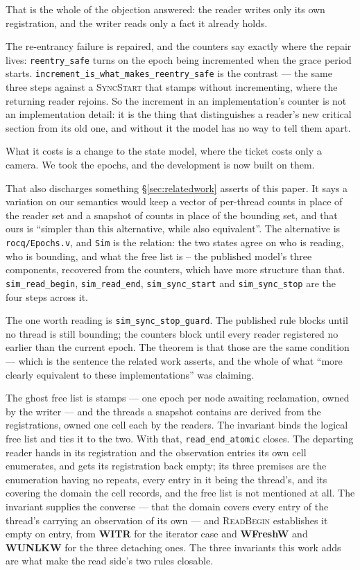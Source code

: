 That is the whole of the objection answered: the reader writes only its own
registration, and the writer reads only a fact it already holds.

The re-entrancy failure is repaired, and the counters say exactly where the
repair lives: \texttt{reentry\_safe} turns on the epoch being incremented when
the grace period starts.  \texttt{increment\_is\_what\_makes\_reentry\_safe} is
the contrast --- the same three steps against a \textsc{SyncStart} that stamps
without incrementing, where the returning reader rejoins.  So the increment in
an implementation's counter is not an implementation detail: it is the thing
that distinguishes a reader's new critical section from its old one, and without
it the model has no way to tell them apart.

What it costs is a change to the state model, where the ticket costs only a
camera.  We took the epochs, and the development is now built on them.

That also discharges something \S\ref{sec:relatedwork} asserts of this paper.
It says a variation on our semantics would keep a vector of per-thread counts in
place of the reader set and a snapshot of counts in place of the bounding set,
and that ours is ``simpler than this alternative, while also equivalent''.  The
alternative is \texttt{rocq/Epochs.v}, and \texttt{Sim} is the relation: the two
states agree on who is reading, who is bounding, and what the free list is --
the published model's three components, recovered from the counters, which have
more structure than that.  \texttt{sim\_read\_begin},
\texttt{sim\_read\_end}, \texttt{sim\_sync\_start} and \texttt{sim\_sync\_stop}
are the four steps across it.

The one worth reading is \texttt{sim\_sync\_stop\_guard}.  The published rule
blocks until no thread is still bounding; the counters block until every reader
registered no earlier than the current epoch.  The theorem is that those are the
same condition --- which is the sentence the related work asserts, and the whole
of what ``more clearly equivalent to these implementations'' was claiming.

The ghost free list is stamps --- one epoch per node awaiting reclamation,
owned by the writer --- and the threads a snapshot contains are derived from the
registrations, owned one cell each by the readers.  The invariant binds the
logical free list and ties it to the two.  With that,
\texttt{read\_end\_atomic} closes.  The departing reader hands in its
registration and the observation entries its own cell enumerates, and gets its
registration back empty; its three premises are the enumeration having no
repeats, every entry in it being the thread's, and its covering the domain the
cell records, and the free list is not mentioned at all.  The invariant supplies
the converse --- that the domain covers every entry of the thread's carrying an
observation of its own --- and \textsc{ReadBegin} establishes it empty on entry,
from \textbf{WITR} for the iterator case and \textbf{WFreshW} and \textbf{WUNLKW}
for the three detaching ones.  The three invariants this work adds are what make
the read side's two rules closable.

